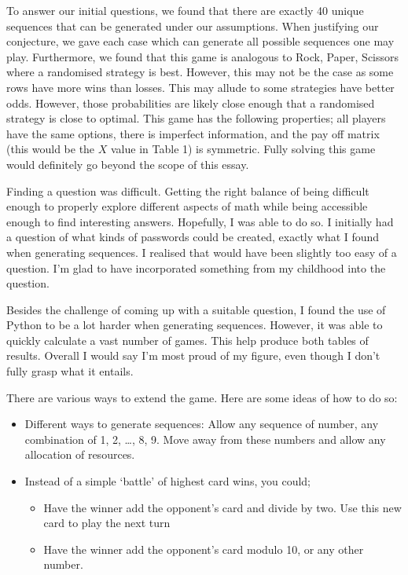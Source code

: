 \documentclass[11pt]{article}
\newcommand{\keywordfont}{\textsc}
\newcommand{\keyword}[1]{%
  \marginpar{\raggedright\small\keywordfont{#1}}}
\begin{document}
To \keyword{Check} answer our initial questions, we found that there are exactly 40 unique sequences that can be generated under our assumptions. When justifying our conjecture, we gave each case which can generate all possible sequences one may play. Furthermore, we found that this game is analogous to Rock, Paper, Scissors where a randomised strategy is best. However, this may not be the case as some rows have more wins than losses. This may allude to some strategies have better odds. However, those probabilities are likely close enough that a randomised strategy is close to optimal. This game has the following properties; all players have the same options, there is imperfect information, and the pay off matrix (this would be the $X$ value in Table 1) is symmetric. Fully solving this game would definitely go beyond the scope of this essay.

Finding \keyword{Reflect} a question was difficult. Getting the right balance of being difficult enough to properly explore different aspects of math while being accessible enough to find interesting answers. Hopefully, I was able to do so. I initially had a question of what kinds of passwords could be created, exactly what I found when generating sequences. I realised that would have been slightly too easy of a question. I'm glad to have incorporated something from my childhood into the question. 

Besides the \keyword{Reflect} challenge of coming up with a suitable question, I found the use of Python to be a lot harder when generating sequences. However, it was able to quickly calculate a vast number of games. This help produce both tables of results. Overall I would say I'm most proud of my figure, even though I don't fully grasp what it entails. 

There are various ways to \keyword{Extend} extend the game. Here are some ideas of how to do so:
\begin{itemize}
    \item Different ways to generate sequences: Allow any sequence of number, any combination of 1, 2, \dots , 8, 9. Move away from these numbers and allow any allocation of resources.
    \item Instead of a simple `battle' of highest card wins, you could;
    \begin{itemize}
        \item Have the winner add the opponent's card and divide by two. Use this new card to play the next turn
        \item Have the winner add the opponent's card modulo 10, or any other number.
    \end{itemize}
\end{itemize}
\end{document}

